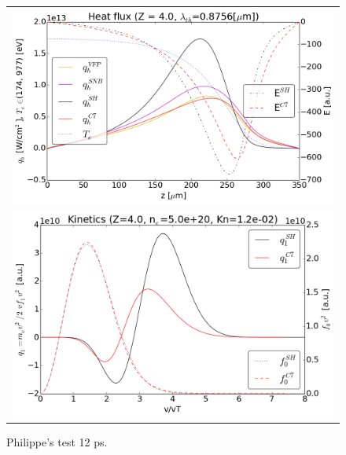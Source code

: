 \documentclass[preprint,12pt]{elsarticle}
\newcommand{\vect}[1]{\boldsymbol{#1}}
\newcommand{\E}{\vect{E}}
\begin{document}
\begin{figure}[tbh]
  \begin{center}
    \begin{tabular}{c}
      \includegraphics[width=1.0\textwidth]{../VFPdata/C7_heatflux_12ps.png} \\ 
      \includegraphics[width=1.0\textwidth]{../VFPdata/C7_kinetics_12ps.png}
    \end{tabular}
  \caption{
  Philippe's test 12 ps.  
  }
  \end{center}
  \label{fig:AWBScorrection_f1}
\end{figure}

\end{document}
